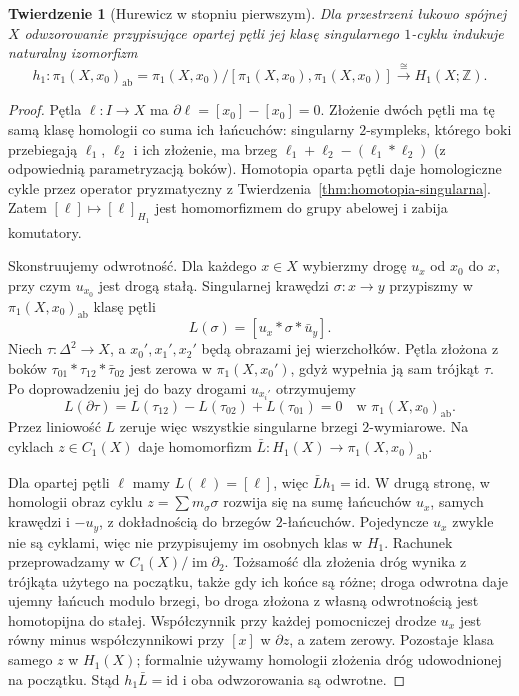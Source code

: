 \documentclass[11pt,a4paper,oneside]{report}
\newcommand{\Z}{\mathbb{Z}}
\newcommand{\id}{\mathrm{id}}
\theoremstyle{plain}
\newtheorem{twierdzenie}{Twierdzenie}[section]
\theoremstyle{definition}
\theoremstyle{remark}
\begin{document}
\begin{twierdzenie}[Hurewicz w stopniu pierwszym]
\label{thm:hurewicz-h1}
Dla przestrzeni łukowo spójnej $X$
odwzorowanie przypisujące opartej pętli
jej klasę singularnego
$1$-cyklu indukuje naturalny
izomorfizm
\[
 h_1:\pi_1(X,x_0)_{\mathrm{ab}}
 =\pi_1(X,x_0)/
 [\pi_1(X,x_0),\pi_1(X,x_0)]
 \xrightarrow{\ \cong\ }H_1(X;\Z).
\]
\end{twierdzenie}
\begin{proof}
Pętla $\ell:I\to X$ ma
$\partial\ell=[x_0]-[x_0]=0$.
Złożenie dwóch pętli
ma tę samą klasę homologii
co suma ich łańcuchów:
singularny $2$-sympleks, którego boki
przebiegają $\ell_1$, $\ell_2$ i ich złożenie, ma
brzeg $\ell_1+\ell_2-
(\ell_1*\ell_2)$
(z odpowiednią
parametryzacją boków).
Homotopia oparta pętli daje homologiczne cykle przez operator pryzmatyczny
z Twierdzenia~\ref{thm:homotopia-singularna}.
Zatem $[\ell]\mapsto
[\ell]_{H_1}$ jest
homomorfizmem do grupy
abelowej i zabija komutatory.

Skonstruujemy odwrotność.
Dla każdego $x\in X$
wybierzmy drogę $u_x$
od $x_0$ do $x$,
przy czym $u_{x_0}$
jest drogą stałą.
Singularnej krawędzi
$\sigma:x\to y$
przypiszmy w
$\pi_1(X,x_0)_{\mathrm{ab}}$
klasę pętli
\[
 L(\sigma)
 =[u_x*\sigma*\bar u_y].
\]
Niech $\tau:\Delta^2\to X$,
a $x_0',x_1',x_2'$
będą obrazami jej
wierzchołków.
Pętla złożona z boków
$\tau_{01}*\tau_{12}*
\bar\tau_{02}$ jest
zerowa w $\pi_1(X,x_0')$,
gdyż wypełnia ją
sam trójkąt $\tau$.
Po doprowadzeniu jej
do bazy drogami $u_{x_i'}$
otrzymujemy
\[
 L(\partial\tau)
 =L(\tau_{12})-L(\tau_{02})
  +L(\tau_{01})=0
 \quad\text{w }\pi_1(X,x_0)_{\mathrm{ab}}.
\]
Przez liniowość $L$
zeruje więc wszystkie
singularne brzegi
$2$-wymiarowe.
Na cyklach $z\in C_1(X)$
daje homomorfizm
$\bar L:H_1(X)\to
\pi_1(X,x_0)_{\mathrm{ab}}$.

Dla opartej pętli
$\ell$ mamy $L(\ell)=[\ell]$,
więc $\bar Lh_1=\id$.
W drugą stronę,
w homologii
obraz cyklu
$z=\sum m_\sigma\sigma$
rozwija się na
sumę łańcuchów $u_x$, samych krawędzi i $-u_y$,
z dokładnością do brzegów $2$-łańcuchów.
Pojedyncze $u_x$ zwykle nie są cyklami, więc nie przypisujemy
im osobnych klas w $H_1$. Rachunek przeprowadzamy w $C_1(X)/\operatorname{im}\partial_2$.
Tożsamość dla złożenia dróg wynika z trójkąta użytego na początku,
także gdy ich końce są różne; droga odwrotna daje ujemny łańcuch
modulo brzegi, bo droga złożona z własną odwrotnością jest homotopijna do stałej.
Współczynnik przy
każdej pomocniczej
drodze $u_x$ jest
równy minus współczynnikowi
przy $[x]$ w $\partial z$,
a zatem zerowy.
Pozostaje klasa
samego $z$ w $H_1(X)$;
formalnie używamy
homologii złożenia
dróg udowodnionej
na początku. Stąd
$h_1\bar L=\id$
i oba odwzorowania są
odwrotne.
\end{proof}
\end{document}

